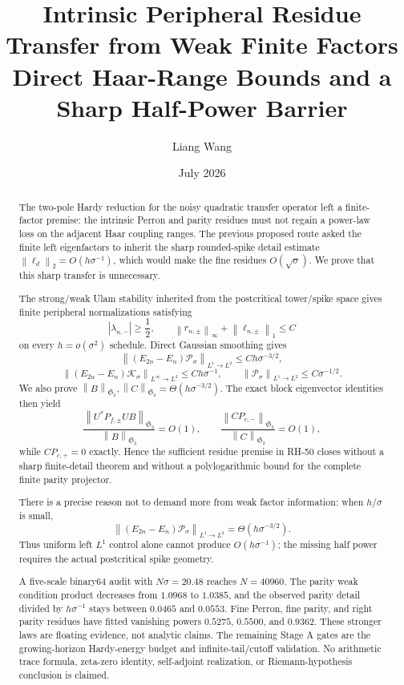 \documentclass[11pt]{article}
\title{Intrinsic Peripheral Residue Transfer from Weak Finite Factors\\
\large Direct Haar-Range Bounds and a Sharp Half-Power Barrier}
\author{Liang Wang}
\date{July 2026}
\theoremstyle{remark}
\newcommand{\cK}{\mathcal K}
\newcommand{\cP}{\mathcal P}
\newcommand{\HS}{\mathfrak S_2}
\newcommand{\norm}[1]{\left\lVert #1\right\rVert}
\begin{document}
\maketitle

\begin{abstract}
The two-pole Hardy reduction for the noisy quadratic transfer operator
left a finite-factor premise: the intrinsic Perron and parity residues must
not regain a power-law loss on the adjacent Haar coupling ranges.  The
previous proposed route asked the finite left eigenfactors to inherit the
sharp rounded-spike detail estimate
\(\norm{\ell_d}_2=O(h\sigma^{-1})\), which would make the fine residues
\(O(\sqrt{\sigma})\).  We prove that this sharp transfer is unnecessary.

The strong/weak Ulam stability inherited from the postcritical tower/spike
space gives finite peripheral normalizations satisfying
\[
 |\lambda_{n,-}|\ge\frac12,\qquad
 \norm{r_{n,\pm}}_\infty+\norm{\ell_{n,\pm}}_1\le C
\]
on every \(h=o(\sigma^2)\) schedule.  Direct Gaussian smoothing gives
\[
 \norm{(E_{2n}-E_n)\cP_\sigma}_{L^1\to L^2}
 \le Ch\sigma^{-3/2},
\]
\[
 \norm{(E_{2n}-E_n)\cK_\sigma}_{L^\infty\to L^2}
 \le Ch\sigma^{-1},\qquad
 \norm{\cP_\sigma}_{L^1\to L^2}\le C\sigma^{-1/2}.
\]
We also prove
\(\norm B_{\HS},\norm C_{\HS}=\Theta(h\sigma^{-3/2})\).
The exact block eigenvector identities then yield
\[
 \frac{\norm{U^*P_{f,\pm}UB}_{\HS}}{\norm B_{\HS}}=O(1),
 \qquad
 \frac{\norm{CP_{c,-}}_{\HS}}{\norm C_{\HS}}=O(1),
\]
while \(CP_{c,+}=0\) exactly.  Hence the sufficient residue premise in
RH-50 closes without a sharp finite-detail theorem and without a
polylogarithmic bound for the complete finite parity projector.

There is a precise reason not to demand more from weak factor information:
when \(h/\sigma\) is small,
\[
 \norm{(E_{2n}-E_n)\cP_\sigma}_{L^1\to L^2}
 =\Theta(h\sigma^{-3/2}).
\]
Thus uniform left \(L^1\) control alone cannot produce
\(O(h\sigma^{-1})\); the missing half power requires the actual
postcritical spike geometry.

A five-scale binary64 audit with \(N\sigma=20.48\) reaches \(N=40960\).
The parity weak condition product decreases from \(1.0968\) to \(1.0385\),
and the observed parity detail divided by \(h\sigma^{-1}\) stays between
\(0.0465\) and \(0.0553\).  Fine Perron, fine parity, and right parity
residues have fitted vanishing powers \(0.5275\), \(0.5500\), and
\(0.9362\).  These stronger laws are floating evidence, not analytic
claims.  The remaining Stage A gates are the growing-horizon Hardy-energy
budget and infinite-tail/cutoff validation.  No arithmetic trace formula,
zeta-zero identity, self-adjoint realization, or Riemann-hypothesis
conclusion is claimed.
\end{abstract}
\end{document}
